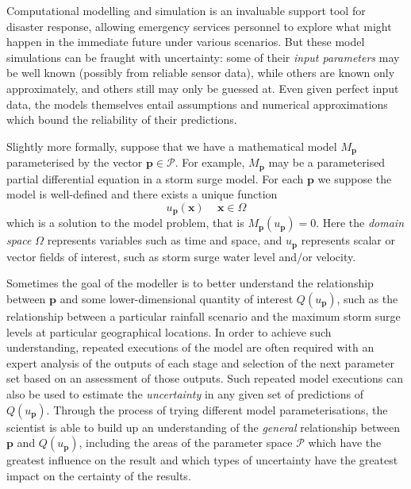 \documentclass[a4paper,fontsize=12pt]{scrartcl}
\begin{document}
Computational modelling and simulation is an invaluable support tool for disaster response,
 allowing  emergency services personnel to explore 
what might happen in the immediate future 
under various scenarios. But these model simulations can be fraught with uncertainty: 
some of their {\em input parameters}  may be well
known (possibly from reliable sensor data), while others are known only approximately, and others still may
only be guessed at. Even given perfect input data, the models themselves entail assumptions and numerical approximations which bound the reliability of their predictions. 

Slightly more formally, suppose that we have a mathematical model $M_{\mathbf{p}}$
parameterised by the vector $\mathbf{p}\in\mathcal{P}$. For example, $M_{\mathbf{p}}$ may
be a parameterised partial differential equation %
in a storm
surge model.
For each $\mathbf{p}$ we suppose the model is
well-defined and there exists a unique function
\begin{equation}
  \label{eq:1}
  u_{\mathbf{p}}(\mathbf{x})\, \quad \mathbf{x}\in\Omega
\end{equation}
which is a solution to the model problem, that is $M_{\mathbf{p}}(u_{\mathbf{p}})=0$.
Here the {\em domain space} $\Omega$ represents variables such as 
time and space, 
and $u_{\mathbf{p}}$ represents scalar or vector fields of interest, 
such as storm surge water level and/or velocity.    

Sometimes the goal of the modeller is to better understand the relationship
between $\mathbf{p}$ and some lower-dimensional quantity of interest
$Q(u_{\mathbf{p}})$, such as the relationship between a particular rainfall scenario and the maximum storm surge levels at particular geographical locations. In order to achieve such understanding, repeated executions of the model are often required with an expert analysis of the outputs of each stage and selection of the next parameter set based on an assessment of those outputs. Such repeated model executions can also be used to estimate the {\em uncertainty} in any given set of predictions of 
$Q(u_{\mathbf{p}})$. Through the process
of trying different model parameterisations, the scientist is able to
build up an understanding of the \emph{general} relationship between
$\mathbf{p}$ and $Q(u_{\mathbf{p}})$, including the areas of the
parameter space $\mathcal{P}$ which have the greatest influence on the
result and which
types of uncertainty have the greatest impact on the certainty of the
results.
\end{document}

